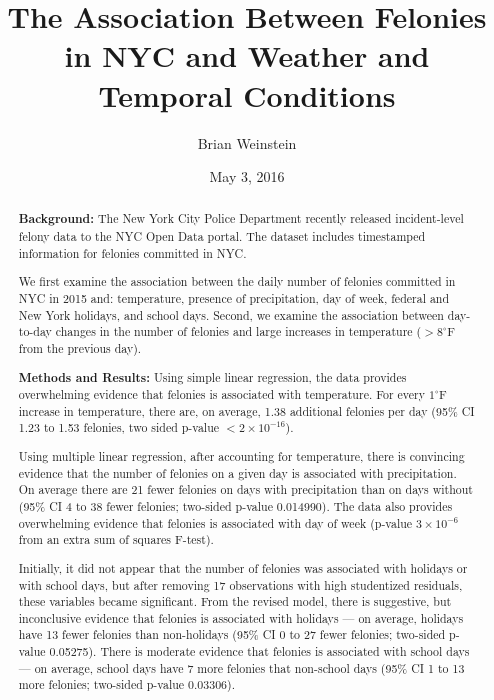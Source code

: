 \documentclass[11pt,notitlepage]{article}
\newcommand{\degf}{^\circ\text{F}}
\begin{document}
\title{The Association Between Felonies in NYC and Weather and Temporal Conditions}
\author{Brian Weinstein}
\date{May 3, 2016}

\maketitle



\begin{abstract}


\noindent \textbf{Background:} The New York City Police Department recently released incident-level felony data to the NYC Open Data portal. The dataset includes timestamped information for felonies committed in NYC.

We first examine the association between the daily number of felonies committed in NYC in 2015 and: temperature, presence of precipitation, day of week, federal and New York holidays, and school days. Second, we examine the association between day-to-day changes in the number of felonies and large increases in temperature ($>8 \degf$ from the previous day).

\noindent \textbf{Methods and Results:} Using simple linear regression, the data provides overwhelming evidence that felonies is associated with temperature. For every $1 \degf$ increase in temperature, there are, on average, 1.38 additional felonies per day (95\% CI 1.23 to 1.53 felonies, two sided p-value $<2\times10^{-16}$).

Using multiple linear regression, after accounting for temperature, there is convincing evidence that the number of felonies on a given day is associated with precipitation. On average there are 21 fewer felonies on days with precipitation than on days without (95\% CI 4 to 38 fewer felonies; two-sided p-value 0.014990). The data also provides overwhelming evidence that felonies is associated with day of week (p-value $3 \times 10^{-6}$ from an extra sum of squares F-test).

Initially, it did not appear that the number of felonies was associated with holidays or with school days, but after removing 17 observations with high studentized residuals, these variables became significant. From the revised model, there is suggestive, but inconclusive evidence that felonies is associated with holidays --- on average, holidays have 13 fewer felonies than non-holidays (95\% CI 0 to 27 fewer felonies; two-sided p-value 0.05275). There is moderate evidence that felonies is associated with school days --- on average, school days have 7 more felonies that non-school days (95\% CI 1 to 13 more felonies; two-sided p-value 0.03306).


\end{abstract}
\end{document}
